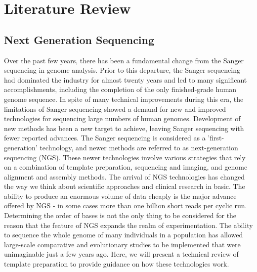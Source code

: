 \chapter{Literature Review}

\section{Next Generation Sequencing}

Over the past few years, there has been a fundamental change from the Sanger sequencing in genome analysis\cite{Maxam1977,Sanger1977}. Prior to this departure, the Sanger sequencing had dominated the industry for almost twenty years and led to many significant accomplishments, including the completion of the only finished-grade human genome sequence\cite{HGP2004}. In spite of many technical improvements during this era, the limitations of Sanger sequencing showed a demand for new and improved technologies for sequencing large numbers of human genomes. Development of new methods has been a new target to achieve, leaving Sanger sequencing with fewer reported advances. The Sanger sequencing is considered as a 'first-generation' technology, and newer methods are referred to as next-generation sequencing (NGS)\cite{Mardis2008}. These newer technologies involve various strategies that rely on a combination of template preparation, sequencing and imaging, and genome alignment and assembly methods. The arrival of NGS technologies has changed the way we think about scientific approaches and clinical research in basic. The ability to produce an enormous volume of data cheaply is the major advance offered by NGS - in some cases more than one billion short reads per cyclic run\cite{Wheeler2008}. Determining the order of bases is not the only thing to be considered for the reason that the feature of NGS expands the realm of experimentation. The ability to sequence the whole genome of many individuals in a population has allowed large-scale comparative and evolutionary studies to be implemented that were unimaginable just a few years ago. Here, we will present a technical review of template preparation to provide guidance on how these technologies work.

